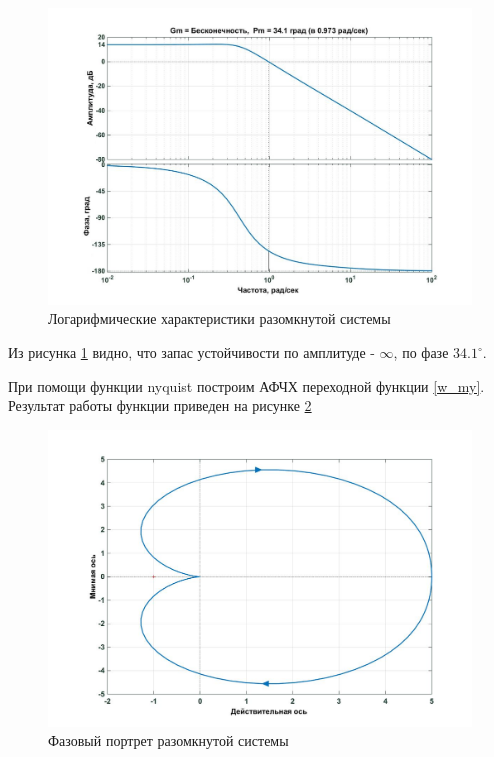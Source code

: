 \documentclass[a4paper, 12pt]{article}
\begin{document}
\newpage

\begin{figure}[h!]
	\centering
	\includegraphics[width = 0.6\textheight]{data/margin}
	\caption{Логарифмические характеристики разомкнутой системы}
	\label{margin}
\end{figure}

Из рисунка \ref{margin} видно, что запас устойчивости по амплитуде - $\infty$, по фазе $34.1^{\circ}$.

\newpage

При помощи функции nyquist построим АФЧХ переходной функции \ref{w_my}. Результат работы функции приведен на  рисунке \ref{nyquist}

\begin{figure}[h!]
	\centering
	\includegraphics[width = 0.6\textheight]{data/nyquist}
	\caption{Фазовый портрет разомкнутой системы}
	\label{nyquist}
\end{figure}
\end{document}
